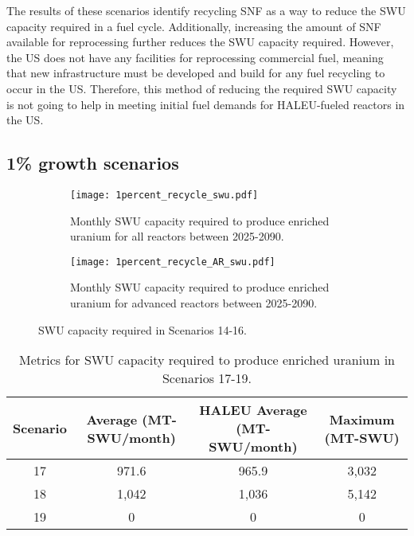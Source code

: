 The results of these scenarios identify recycling \gls{SNF} as a way 
to reduce the \gls{SWU} capacity required in a fuel cycle. Additionally, 
increasing the amount of \gls{SNF} available for reprocessing further 
reduces the \gls{SWU} capacity required. However, the US does not have 
any facilities for reprocessing commercial fuel, meaning that new 
infrastructure must be developed and build for any fuel recycling to 
occur in the US. Therefore, this method of reducing the 
required \gls{SWU} capacity is not going to help in meeting initial 
fuel demands for \gls{HALEU}-fueled reactors in the US. 

\subsection{1\% growth scenarios}

\begin{figure}[h!]
    \centering
    \begin{subfigure}[b]{0.45\textwidth}
        \centering
        \texttt{[image: 1percent\_recycle\_swu.pdf]}
        \caption{Monthly SWU capacity required to produce 
        enriched uranium for all reactors between 2025-2090.}
        \label{fig:1percent_recycle_swu_all}
    \end{subfigure}
    \hfill
    \begin{subfigure}[b]{0.45\textwidth}
        \centering
        \texttt{[image: 1percent\_recycle\_AR\_swu.pdf]}
        \caption{Monthly SWU capacity required to produce 
        enriched uranium for advanced reactors between 2025-2090.}
        \label{fig:1percent_recycle_swu_AR}
    \end{subfigure}
       \caption{\gls{SWU} capacity required in Scenarios 14-16.}
       \label{fig:1percent_recycle_swu}
\end{figure}

\begin{table}[h!]
    \centering 
    \caption{Metrics for \gls{SWU} capacity required to produce 
    enriched uranium in Scenarios 17-19.}
    \label{tab:s17-19_swu}
    \begin{tabular}{c c c c}
        \hline 
        Scenario & Average (MT-SWU/month) & HALEU Average (MT-SWU/month)
         & Maximum (MT-SWU) \\
        \hline 
        17 & 971.6 & 965.9 & 3,032 \\
        18 & 1,042 & 1,036 & 5,142 \\
        19 & 0 & 0 & 0 \\
        \hline
        
    \end{tabular}
\end{table}

